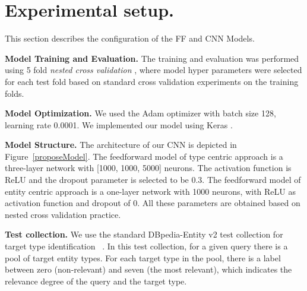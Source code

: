 \section{Experimental setup.}
This section describes the configuration of the FF and CNN Models.

\textbf{Model Training and Evaluation.} The training and evaluation was performed using 5 fold \textit{nested cross validation} \cite{cawley2010over}, where model hyper parameters were selected for each test fold based on standard cross validation experiments on the training folds.

\textbf{Model Optimization.} We used the Adam optimizer with batch size 128, learning rate 0.0001. We implemented our model using Keras \cite{chollet2015keras}.

\textbf{Model Structure.} The architecture of our CNN is depicted in Figure~\ref{proposeModel}. The feedforward model of type centric approach is a three-layer network with [1000, 1000, 5000] neurons. The activation function is ReLU and the dropout parameter is selected to be 0.3. The feedforward model of entity centric approach is a one-layer network with 1000 neurons, with ReLU as activation function and dropout of 0. All these parameters are obtained based on nested cross validation practice.

\textbf{Test collection. } We use the standard DBpedia-Entity v2 test collection for target type identification~ \cite{Garigliotti:2017:TTI:3077136.3080659}. In this test collection, for a given query there is a pool of target entity types. For each target type in the pool, there is a label between zero (non-relevant) and seven (the most relevant), which indicates the relevance degree of the query and the target type.